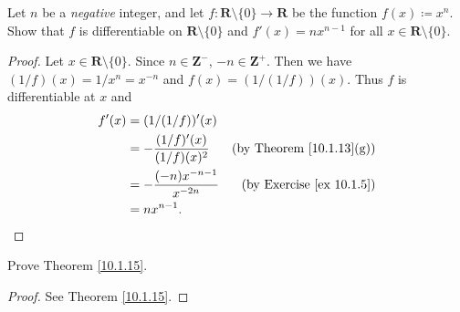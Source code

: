 \begin{exercise}\label{ex 10.1.6}
    Let \(n\) be a \emph{negative} integer, and let \(f : \mathbf{R} \setminus \{0\} \to \mathbf{R}\) be the function \(f(x) \coloneqq x^n\).
    Show that \(f\) is differentiable on \(\mathbf{R} \setminus \{0\}\) and \(f'(x) = n x^{n - 1}\) for all \(x \in \mathbf{R} \setminus \{0\}\).
\end{exercise}

\begin{proof}
    Let \(x \in \mathbf{R} \setminus \{0\}\).
    Since \(n \in \mathbf{Z}^-\), \(-n \in \mathbf{Z}^+\).
    Then we have \((1 / f)(x) = 1 / x^n = x^{-n}\) and \(f(x) = (1 / (1 / f))(x)\).
    Thus \(f\) is differentiable at \(x\) and
    \begin{align*}
        f'(x) & = (1 / (1 / f))'(x)                                                        \\
              & = -\frac{(1 / f)'(x)}{(1 / f)(x)^2} & \text{(by Theorem \ref{10.1.13}(g))} \\
              & = -\frac{(-n) x^{-n - 1}}{x^{-2n}}  & \text{(by Exercise \ref{ex 10.1.5})} \\
              & = n x^{n - 1}.
    \end{align*}
\end{proof}

\begin{exercise}\label{ex 10.1.7}
    Prove Theorem \ref{10.1.15}.
\end{exercise}

\begin{proof}
    See Theorem \ref{10.1.15}.
\end{proof}